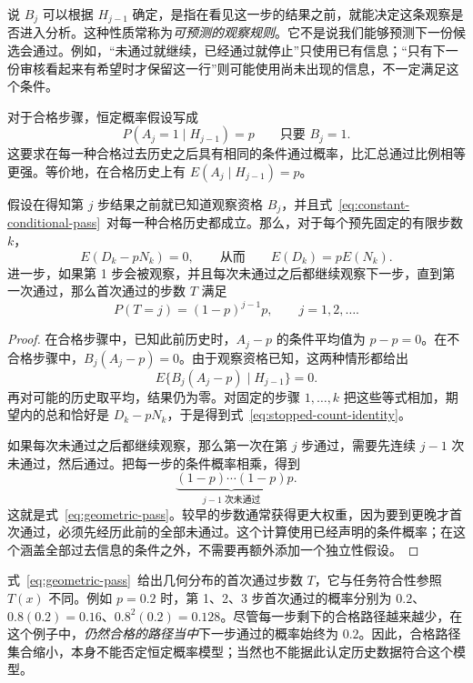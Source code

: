 说 $B_j$ 可以根据 $H_{j-1}$ 确定，是指在看见这一步的结果之前，就能决定这条观察是否进入分析。这种性质常称为\emph{可预测的观察规则}。它不是说我们能够预测下一份候选会通过。例如，“未通过就继续，已经通过就停止”只使用已有信息；“只有下一份审核看起来有希望时才保留这一行”则可能使用尚未出现的信息，不一定满足这个条件。

对于合格步骤，恒定概率假设写成
\begin{equation}
 P(A_j=1\mid H_{j-1})=p\qquad\text{只要 }B_j=1.
 \label{eq:constant-conditional-pass}
\end{equation}
这要求在每一种合格过去历史之后具有相同的条件通过概率，比汇总通过比例相等更强。等价地，在合格历史上有 $E(A_j\mid H_{j-1})=p$。

\begin{proposition}[明确观察规则下的恒定条件概率]
\label{prop:stopping}
假设在得知第 $j$ 步结果之前就已知道观察资格 $B_j$，并且式~\eqref{eq:constant-conditional-pass}~对每一种合格历史都成立。那么，对于每个预先固定的有限步数 $k$，
\begin{equation}
 E(D_k-pN_k)=0,\qquad\text{从而}\qquad E(D_k)=pE(N_k).
 \label{eq:stopped-count-identity}
\end{equation}
进一步，如果第 1 步会被观察，并且每次未通过之后都继续观察下一步，直到第一次通过，那么首次通过的步数 $T$ 满足
\begin{equation}
 P(T=j)=(1-p)^{j-1}p,\qquad j=1,2,\ldots.
 \label{eq:geometric-pass}
\end{equation}
\end{proposition}

\begin{proof}
在合格步骤中，已知此前历史时，$A_j-p$ 的条件平均值为 $p-p=0$。在不合格步骤中，$B_j(A_j-p)=0$。由于观察资格已知，这两种情形都给出
\[
 E\{B_j(A_j-p)\mid H_{j-1}\}=0.
\]
再对可能的历史取平均，结果仍为零。对固定的步骤 $1,\ldots,k$ 把这些等式相加，期望内的总和恰好是 $D_k-pN_k$，于是得到式~\eqref{eq:stopped-count-identity}。

如果每次未通过之后都继续观察，那么第一次在第 $j$ 步通过，需要先连续 $j-1$ 次未通过，然后通过。把每一步的条件概率相乘，得到
\[
 \underbrace{(1-p)\cdots(1-p)}_{j-1\text{ 次未通过}}p.
\]
这就是式~\eqref{eq:geometric-pass}。较早的步数通常获得更大权重，因为要到更晚才首次通过，必须先经历此前的全部未通过。这个计算使用已经声明的条件概率；在这个涵盖全部过去信息的条件之外，不需要再额外添加一个独立性假设。
\end{proof}

式~\eqref{eq:geometric-pass}~给出几何分布的首次通过步数 $T$，它与任务符合性参照 $T(x)$ 不同。例如 $p=0.2$ 时，第 1、2、3 步首次通过的概率分别为 $0.2$、$0.8(0.2)=0.16$、$0.8^2(0.2)=0.128$。尽管每一步剩下的合格路径越来越少，在这个例子中，\emph{仍然合格的路径当中}下一步通过的概率始终为 $0.2$。因此，合格路径集合缩小，本身不能否定恒定概率模型；当然也不能据此认定历史数据符合这个模型。

